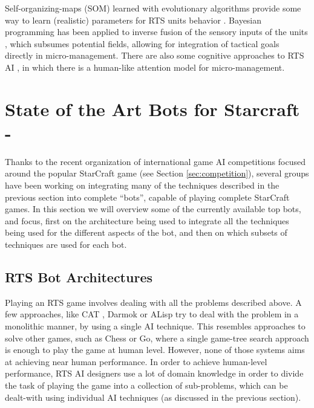 \documentclass[journal]{IEEEtran}
\begin{document}
Self-organizing-maps (SOM) learned with evolutionary algorithms provide some way to learn (realistic) parameters for RTS units behavior \cite{teamCompositionRTS}. Bayesian programming has been applied to inverse fusion of the sensory inputs of the units \cite{SynnaeveMicroCig11}, which subsumes potential fields, allowing for integration of tactical goals directly in micro-management. There are also some cognitive approaches to RTS AI \cite{SORTS}, in which there is a human-like attention model for micro-management.


\section{State of the Art Bots for Starcraft - \color{blue}{Information/Productions}}\label{sec:bot}

Thanks to the recent organization of international game AI competitions focused around the popular StarCraft game (see Section \ref{sec:competition}), several groups have been working on integrating many of the techniques described in the previous section into complete ``bots'', capable of playing complete StarCraft games. In this section we will overview some of the currently available top bots, and focus, first on the architecture being used to integrate all the techniques being used for the different aspects of the bot, and then on which subsets of techniques are used for each bot.

\subsection{RTS Bot Architectures}\label{sec:integration}

Playing an RTS game involves dealing with all the problems described above. A few approaches, like CAT \cite{LTW}, Darmok \cite{OntanonMSR10} or ALisp \cite{Marthi05} try to deal with the problem in a monolithic manner, by using a single AI technique. This resembles approaches to solve other games, such as Chess or Go, where a single game-tree search approach is enough to play the game at human level. However, none of those systems aims at achieving near human performance. In order to achieve human-level performance, RTS AI designers use a lot of domain knowledge in order to divide the task of playing the game into a collection of sub-problems, which can be dealt-with using individual AI techniques (as discussed in the previous section). 
\end{document}
